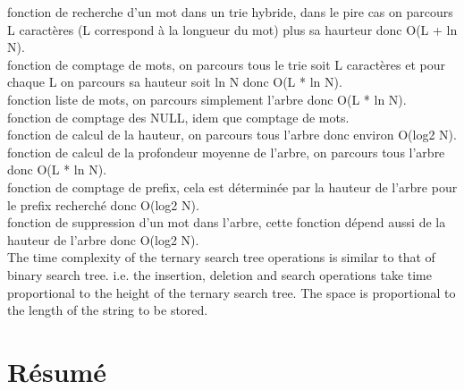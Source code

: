 \documentclass[a4paper,8pt]{report}
\begin{document}
fonction de recherche d'un mot dans un trie hybride, dans le pire cas on parcours L caract\`eres (L correspond \`a la longueur du mot) plus sa haurteur donc O(L + ln N).\\
fonction de comptage de mots, on parcours tous le trie soit L caract\`eres et pour chaque L on parcours sa hauteur soit ln N donc O(L * ln N).\\
fonction liste de mots, on parcours simplement l'arbre donc O(L * ln N).\\
fonction de comptage des NULL, idem que comptage de mots.\\
fonction de calcul de la hauteur, on parcours tous l'arbre donc environ O(log2 N).\\
fonction de calcul de la profondeur moyenne de l'arbre, on parcours tous l'arbre donc O(L * ln N).\\
fonction de comptage de prefix, cela est d\'etermin\'ee par la hauteur de l'arbre pour le prefix recherch\'e donc O(log2 N).\\
fonction de suppression d'un mot dans l'arbre, cette fonction d\'epend aussi de la hauteur de l'arbre donc O(log2 N).\\


The time complexity of the ternary search tree operations is similar to that of binary search tree. i.e. the insertion, deletion and search operations take time proportional to the height of the ternary search tree. The space is proportional to the length of the string to be stored.

\section*{R\'esum\'e}\label{sec:name}
\end{document}

